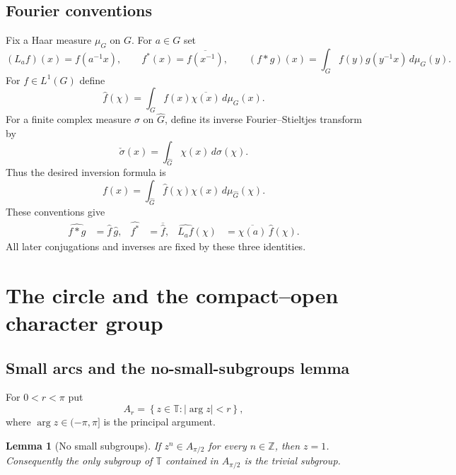 \documentclass[11pt]{article}
\newtheorem{lemma}[theorem]{Lemma}
\theoremstyle{definition}
\theoremstyle{remark}
\newcommand{\T}{\mathbb T}
\newcommand{\Z}{\mathbb Z}
\newcommand{\argu}{\operatorname{arg}}
\newcommand{\Lp}[1]{L^{#1}}
\newcommand{\dual}[1]{\widehat{#1}}
\newcommand{\abs}[1]{\lvert #1\rvert}
\newcommand{\set}[1]{\left\{#1\right\}}
\begin{document}
\subsection{Fourier conventions}
\label{subsec:conventions}

Fix a Haar measure $\mu_G$ on $G$.  For $a\in G$ set
\[
  (L_a f)(x)=f(a^{-1}x),\qquad
  f^*(x)=\overline{f(x^{-1})},\qquad
  (f*g)(x)=\int_G f(y)g(y^{-1}x)\,d\mu_G(y).
\]
For $f\in\Lp1(G)$ define
\begin{equation}
  \widehat f(\chi)=\int_G f(x)\overline{\chi(x)}\,d\mu_G(x).
  \label{eq:fourier-convention}
\end{equation}
For a finite complex measure $\sigma$ on $\dual G$, define its inverse
Fourier--Stieltjes transform by
\begin{equation}
  \check\sigma(x)=\int_{\dual G}\chi(x)\,d\sigma(\chi).
  \label{eq:FS-convention}
\end{equation}
Thus the desired inversion formula is
\begin{equation}
  f(x)=\int_{\dual G}\widehat f(\chi)\chi(x)\,d\mu_{\dual G}(\chi).
  \label{eq:desired-inversion}
\end{equation}
These conventions give
\begin{align}
  \widehat{f*g}&=\widehat f\,\widehat g,
  &\widehat{f^*}&=\overline{\widehat f},
  &\widehat{L_a f}(\chi)&=\overline{\chi(a)}\,\widehat f(\chi).
  \label{eq:fourier-identities}
\end{align}
All later conjugations and inverses are fixed by these three identities.

\section{The circle and the compact--open character group}
\label{sec:compact-open}

\subsection{Small arcs and the no-small-subgroups lemma}

For $0<r<\pi$ put
\[
  A_r=\set{z\in\T:\abs{\argu z}<r},
\]
where $\argu z\in(-\pi,\pi]$ is the principal argument.

\begin{lemma}[No small subgroups]
\label{lem:nss-circle}
If $z^n\in A_{\pi/2}$ for every $n\in\Z$, then $z=1$.  Consequently the only subgroup
of $\T$ contained in $A_{\pi/2}$ is the trivial subgroup.
\end{lemma}
\end{document}
